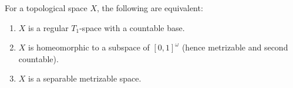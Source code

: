 For a topological space $X$, the following are equivalent:
\begin{enumerate}
\item[(a)] $X$ is a regular $T_1$-space with a countable base.
\item[(b)] $X$ is homeomorphic to a subspace of $[0,1]^\omega$ (hence metrizable and second countable).
\item[(c)] $X$ is a separable metrizable space.
\end{enumerate}

